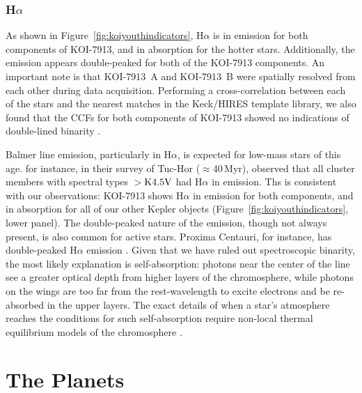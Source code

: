 \documentclass[12pt,twocolumn,tighten,linenumbers,trackchanges]{aastex63}
\begin{document}
\subsubsection{H$\alpha$}

As shown in Figure~\ref{fig:koiyouthindicators}, H$\alpha$ is in
emission for both components of KOI-7913, and in absorption for the
hotter stars.  Additionally, the emission appears double-peaked for
both of the KOI-7913 components.  An important note is that KOI-7913~A and
KOI-7913~B were spatially resolved from each other during data
acquisition.  Performing a cross-correlation between each of the stars
and the nearest matches in the Keck/HIRES template library, we also
found that the CCFs for both components of KOI-7913 showed no
indications of double-lined binarity \citep{kolbl_detection_2015}.

Balmer line emission, particularly in H$\alpha$, is expected for
low-mass stars of this age.  \citet{kraus_stellar_2014} for instance, in their
survey of Tuc-Hor ($\approx$40\,Myr), observed that all
cluster members with spectral types $>$${\rm K4.5V}$ had H$\alpha$ in
emission.  Ths is consistent with our observations: KOI-7913 shows
H$\alpha$ in emission for both components, and in absorption
for all of our other Kepler objects (Figure~\ref{fig:koiyouthindicators}, lower panel).  The double-peaked nature of the
emission, though not always present, is also common for
active stars.  Proxima Centauri, for instance, has double-peaked
H$\alpha$ emission \citep{collins_calculations_2017}.  Given
that we have ruled out spectroscopic binarity, the most
likely
explanation is self-absorption: photons near the center of the line
see a greater optical depth from higher layers of the chromosphere,
while photons on the wings are too far from the
rest-wavelength to excite electrons and be re-absorbed in the upper
layers.  The exact details of when a star's atmosphere reaches the
conditions for such self-absorption require non-local thermal
equilibrium models of the chromosphere
\citep{short_chromospheric_1998,2005A&A...439.1137F}.







\section{The Planets}
\label{sec:planets}
\end{document}
